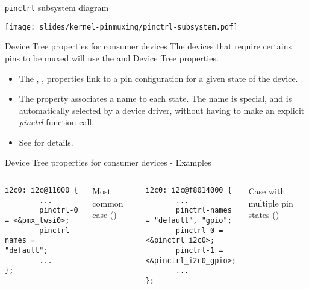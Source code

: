\begin{frame}{{\tt pinctrl} subsystem diagram}
  \begin{center}
    \texttt{[image: slides/kernel-pinmuxing/pinctrl-subsystem.pdf]}
  \end{center}
\end{frame}

\begin{frame}[fragile]{Device Tree properties for consumer devices}
  The devices that require certains pins to be muxed will use
  the  and  Device Tree
  properties.
  \begin{itemize}
     \item The , , 
       properties link to a pin configuration for a given state of the
       device.
     \item The  property associates a name to each
       state. The name  is special, and is automatically
       selected by a device driver, without having to make an explicit
       {\em pinctrl} function call.
     \item See 
       for details.
  \end{itemize}
\end{frame}

\begin{frame}[fragile]{Device Tree properties for consumer devices - Examples}
  \begin{columns}
    \begin{verbatim}
i2c0: i2c@11000 {
        ...
        pinctrl-0 = <&pmx_twsi0>;
        pinctrl-names = "default";
        ...
};
\end{verbatim}
    Most common case ()
    \begin{verbatim}
i2c0: i2c@f8014000 {
       ...
       pinctrl-names = "default", "gpio";
       pinctrl-0 = <&pinctrl_i2c0>;
       pinctrl-1 = <&pinctrl_i2c0_gpio>;
       ...
};
\end{verbatim}
    Case with multiple pin states ()
  \end{columns}
\end{frame}

